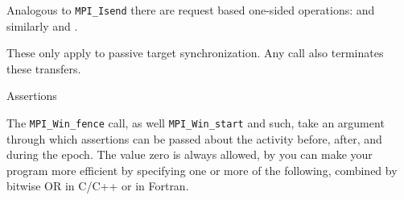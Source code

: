 Analogous to \lstinline$MPI_Isend$ there are request based one-sided operations:
%
%
and similarly  and .

These only apply to passive target synchronization.
Any  call also terminates these transfers.

 {Assertions}
\label{sec:mpi-assert}

The \lstinline$MPI_Win_fence$ call, as well \lstinline$MPI_Win_start$ and such, take an argument
through which assertions can be passed about the activity before, after, and during the epoch.
The value zero is always allowed, by you can make your program more efficient by specifying
one or more of the following, combined by bitwise OR in C/C++ or
 in Fortran.

